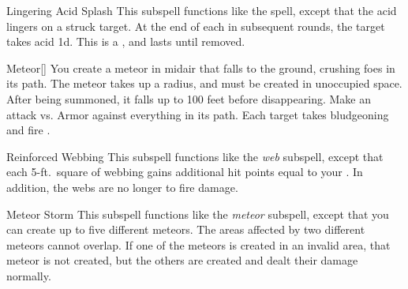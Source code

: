 \begin{ability}[\nth{3}]{Lingering Acid Splash}
This subspell functions like the  spell, except that the acid lingers on a struck target.
At the end of each  in subsequent rounds, the target takes acid  \minus1d.
This is a , and lasts until removed.
\end{ability}
\vspace{0.25em}


\begin{ability}[\nth{3}]{Meteor}[]
You create a meteor in midair that falls to the ground, crushing foes in its path.
The meteor takes up a \areamed radius, and must be created in unoccupied space.
After being summoned, it falls up to 100 feet before disappearing.
Make an attack vs. Armor against everything in its path.
\hit Each target takes bludgeoning and fire .
\end{ability}
\vspace{0.25em}


\begin{ability}[\nth{3}]{Reinforced Webbing}
This subspell functions like the \textit{web} subspell, except that each 5-ft.\ square of webbing gains additional hit points equal to your .
In addition, the webs are no longer  to fire damage.
\end{ability}
\vspace{0.25em}


\begin{ability}[\nth{5}]{Meteor Storm}
This subspell functions like the \textit{meteor} subspell, except that you can create up to five different meteors.
The areas affected by two different meteors cannot overlap.
If one of the meteors is created in an invalid area, that meteor is not created, but the others are created and dealt their damage normally.
\end{ability}
\vspace{0.25em}

